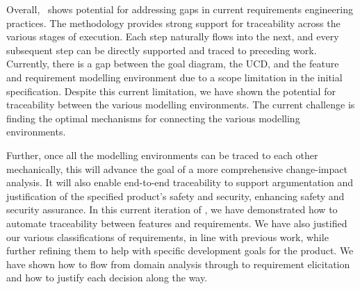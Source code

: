 Overall, \tool\ shows potential for addressing gaps in current requirements engineering practices. The methodology provides strong support for traceability across the various stages of execution. Each step naturally flows into the next, and every subsequent step can be directly supported and traced to preceding work. Currently, there is a gap between the goal diagram, the \gls{UCD}, and the feature and requirement modelling environment due to a scope limitation in the initial specification. Despite this current limitation, we have shown the potential for traceability between the various modelling environments. The current challenge is finding the optimal mechanisms for connecting the various modelling environments.

Further, once all the modelling environments can be traced to each other mechanically, this will advance the goal of a more comprehensive change-impact analysis. It will also enable end-to-end traceability to support argumentation and justification of the specified product's safety and security, enhancing safety and security assurance. In this current iteration of \tool, we have demonstrated how to automate traceability between features and requirements. We have also justified our various classifications of requirements, in line with previous work, while further refining them to help with specific development goals for the product. We have shown how to flow from domain analysis through to requirement elicitation and how to justify each decision along the way. 

%
%
%
%
